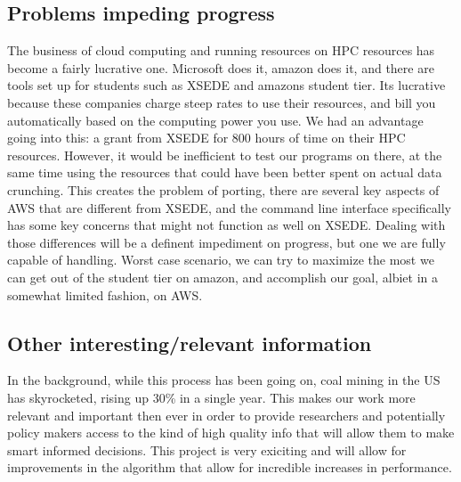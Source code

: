 \documentclass[onecolumn, draftclsnofoot,10pt, compsoc]{IEEEtran}
\begin{document}
\subsection{Problems impeding progress}
The business of cloud computing and running resources on HPC resources has become a fairly lucrative one. Microsoft does it, amazon does it, and there are tools set up for students such as XSEDE and amazons student tier. Its lucrative because these companies charge steep rates to use their resources, and bill you automatically based on the computing power you use. We had an advantage going into this: a grant from XSEDE for 800 hours of time on their HPC resources. However, it would be inefficient to test our programs on there, at the same time using the resources that could have been better spent on actual data crunching. This creates the problem of porting, there are several key aspects of AWS that are different from XSEDE, and the command line interface specifically has some key concerns that might not function as well on XSEDE. Dealing with those differences will be a definent impediment on progress, but one we are fully capable of handling. Worst case scenario, we can try to maximize the most we can get out of the student tier on amazon, and accomplish our goal, albiet in a somewhat limited fashion, on AWS.
\subsection{Other interesting/relevant information}
In the background, while this process has been going on, coal mining in the US has skyrocketed, rising up 30\% in a single year. This makes our work more relevant and important then ever in order to provide researchers and potentially policy makers access to the kind of high quality info that will allow them to make smart informed decisions. This project is very exiciting and will allow for improvements in the algorithm that allow for incredible increases in performance.
\end{document}

